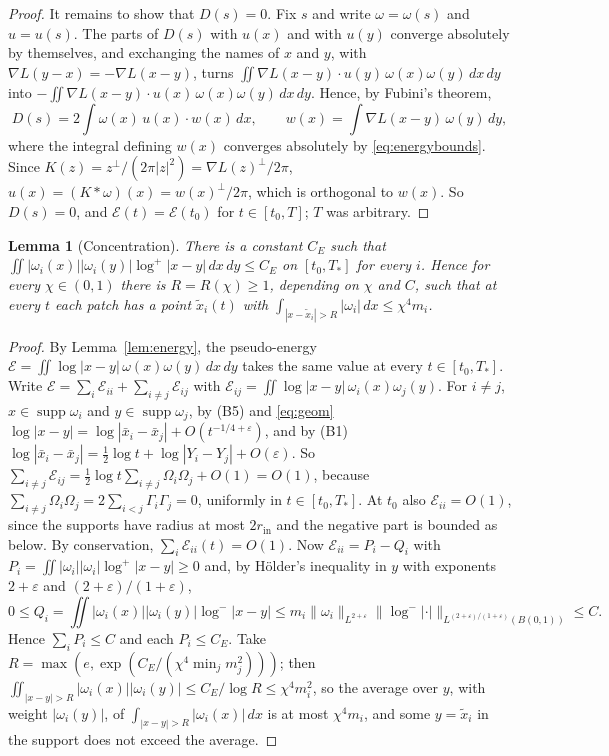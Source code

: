 \documentclass[11pt]{article}
\newtheorem{lemma}{Lemma}
\theoremstyle{definition}
\begin{document}
\begin{proof}
It remains to show that $D(s) = 0$. Fix $s$ and write $\omega = \omega(s)$ and $u = u(s)$. The parts of $D(s)$ with $u(x)$ and with $u(y)$ converge absolutely by themselves, and exchanging the names of $x$ and $y$, with $\nabla L(y - x) = -\nabla L(x - y)$, turns $\iint\nabla L(x - y)\cdot u(y)\,\omega(x)\omega(y)\,dx\,dy$ into $-\iint\nabla L(x - y)\cdot u(x)\,\omega(x)\omega(y)\,dx\,dy$. Hence, by Fubini's theorem,
\[
  D(s) = 2\int\omega(x)\,u(x)\cdot w(x)\,dx,\qquad w(x) = \int\nabla L(x - y)\,\omega(y)\,dy,
\]
where the integral defining $w(x)$ converges absolutely by \eqref{eq:energybounds}. Since $K(z) = z^\perp/(2\pi|z|^2) = \nabla L(z)^\perp/2\pi$, $u(x) = (K*\omega)(x) = w(x)^\perp/2\pi$, which is orthogonal to $w(x)$. So $D(s) = 0$, and $\mathcal E(t) = \mathcal E(t_0)$ for $t \in [t_0, T]$; $T$ was arbitrary.
\end{proof}

\begin{lemma}[Concentration]\label{lem:concentration}
There is a constant $C_E$ such that $\iint|\omega_i(x)||\omega_i(y)|\log^+|x - y|\,dx\,dy \le C_E$ on $[t_0, T_*]$ for every $i$. Hence for every $\chi \in (0, 1)$ there is $R = R(\chi) \ge 1$, depending on $\chi$ and $C$, such that at every $t$ each patch has a point $\tilde x_i(t)$ with $\int_{|x - \tilde x_i| > R}|\omega_i|\,dx \le \chi^4m_i$.
\end{lemma}

\begin{proof}
By Lemma~\ref{lem:energy}, the pseudo-energy $\mathcal E = \iint\log|x - y|\,\omega(x)\omega(y)\,dx\,dy$ takes the same value at every $t \in [t_0, T_*]$. Write $\mathcal E = \sum_i\mathcal E_{ii} + \sum_{i\ne j}\mathcal E_{ij}$ with $\mathcal E_{ij} = \iint\log|x - y|\,\omega_i(x)\omega_j(y)$. For $i \ne j$, $x \in \operatorname{supp}\omega_i$ and $y \in \operatorname{supp}\omega_j$, by (B5) and \eqref{eq:geom} $\log|x - y| = \log|\bar x_i - \bar x_j| + O(t^{-1/4+\varepsilon})$, and by (B1) $\log|\bar x_i - \bar x_j| = \tfrac12\log t + \log|Y_i - Y_j| + O(\varepsilon)$. So $\sum_{i\ne j}\mathcal E_{ij} = \tfrac12\log t\sum_{i\ne j}\Omega_i\Omega_j + O(1) = O(1)$, because $\sum_{i\ne j}\Omega_i\Omega_j = 2\sum_{i<j}\Gamma_i\Gamma_j = 0$, uniformly in $t \in [t_0, T_*]$. At $t_0$ also $\mathcal E_{ii} = O(1)$, since the supports have radius at most $2r_{\mathrm{in}}$ and the negative part is bounded as below. By conservation, $\sum_i\mathcal E_{ii}(t) = O(1)$. Now $\mathcal E_{ii} = P_i - Q_i$ with $P_i = \iint|\omega_i||\omega_i|\log^+|x - y| \ge 0$ and, by H\"older's inequality in $y$ with exponents $2 + \varepsilon$ and $(2+\varepsilon)/(1+\varepsilon)$,
\[
  0 \le Q_i = \iint|\omega_i(x)||\omega_i(y)|\log^-|x - y| \le m_i\|\omega_i\|_{L^{2+\varepsilon}}\bigl\|\log^-|\cdot|\bigr\|_{L^{(2+\varepsilon)/(1+\varepsilon)}(B(0,1))} \le C.
\]
Hence $\sum_iP_i \le C$ and each $P_i \le C_E$. Take $R = \max(e, \exp(C_E/(\chi^4\min_jm_j^2)))$; then $\iint_{|x - y| > R}|\omega_i(x)||\omega_i(y)| \le C_E/\log R \le \chi^4m_i^2$, so the average over $y$, with weight $|\omega_i(y)|$, of $\int_{|x - y| > R}|\omega_i(x)|\,dx$ is at most $\chi^4m_i$, and some $y = \tilde x_i$ in the support does not exceed the average.
\end{proof}
\end{document}
